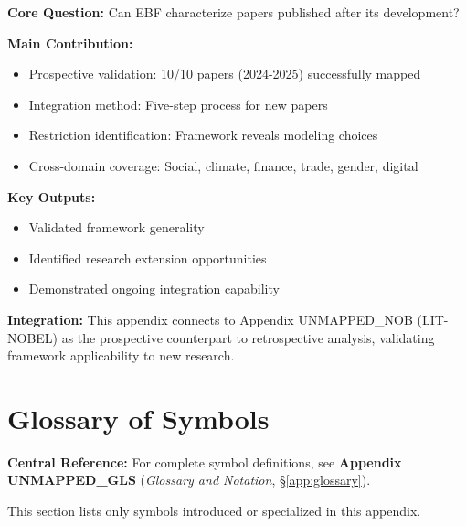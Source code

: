 \begin{tcolorbox}[colback=green!10!white, colframe=green!75!black,
    title=\textbf{Appendix UNMAPPED_REC: Summary}]

\textbf{Core Question:} Can EBF characterize papers published after its
development?

\textbf{Main Contribution:}
\begin{itemize}[nosep]
    \item Prospective validation: 10/10 papers (2024-2025) successfully mapped
    \item Integration method: Five-step process for new papers
    \item Restriction identification: Framework reveals modeling choices
    \item Cross-domain coverage: Social, climate, finance, trade, gender, digital
\end{itemize}

\textbf{Key Outputs:}
\begin{itemize}[nosep]
    \item Validated framework generality
    \item Identified research extension opportunities
    \item Demonstrated ongoing integration capability
\end{itemize}

\textbf{Integration:} This appendix connects to Appendix UNMAPPED_NOB (LIT-NOBEL) as
the prospective counterpart to retrospective analysis, validating framework
applicability to new research.

\end{tcolorbox}


\section{Glossary of Symbols}
\label{sec:J-glossary}

\begin{tcolorbox}[colback=blue!5!white, colframe=blue!75!black]
\textbf{Central Reference:} For complete symbol definitions, see
\textbf{Appendix UNMAPPED_GLS} (\textit{Glossary and Notation}, \S\ref{app:glossary}).

This section lists only symbols introduced or specialized in this appendix.
\end{tcolorbox}

